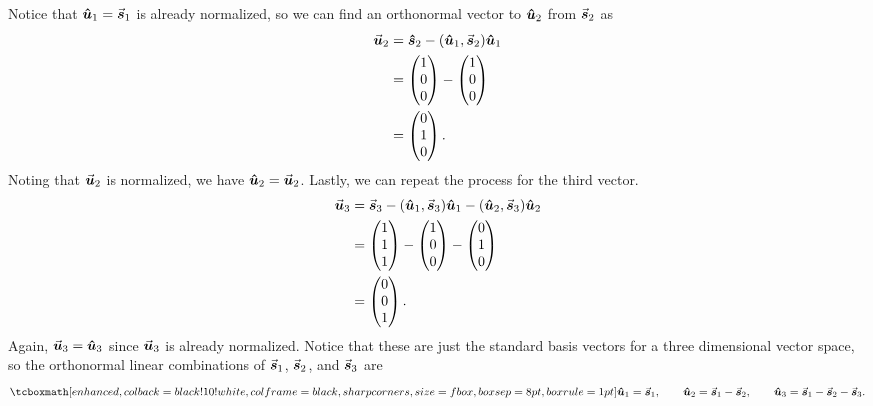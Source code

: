 Notice that $\vu*{u}_{1} = \va*{s}_{1}$ is already normalized, so we can find an orthonormal vector to $\vu*{u}_{2}$ from $\va*{s}_{2}$ as
\begin{align}
    \label{eq:u2-vec}
    \va*{u}_{2} &= \vu*{s}_{2} - (\vu*{u}_{1},\va*{s}_{2})\vu*{u}_{1} \\
                &= \begin{pmatrix} 1 \\ 0 \\ 0\end{pmatrix} - \begin{pmatrix} 1 \\ 0 \\ 0\end{pmatrix} \\
                &= \begin{pmatrix} 0 \\ 1 \\ 0\end{pmatrix}
.\end{align}
Noting that $\va*{u}_{2}$ is normalized, we have $\vu*{u}_{2} = \va*{u}_{2}$.
Lastly, we can repeat the process for the third vector.
\begin{align}
    \label{eq:u3-vec}
\va*{u}_{3} &= \va*{s}_{3} - (\vu*{u}_{1},\va*{s}_{3})\vu*{u}_{1} - (\vu*{u}_{2},\va*{s}_{3})\vu*{u}_{2} \\
           & = \begin{pmatrix} 1 \\ 1 \\ 1\end{pmatrix} - \begin{pmatrix} 1 \\ 0 \\ 0\end{pmatrix} - \begin{pmatrix} 0 \\ 1 \\ 0\end{pmatrix} \\ 
           &= \begin{pmatrix}
    0 \\ 0 \\ 1
    \end{pmatrix}
.\end{align}
Again, $\va*{u}_{3} = \vu*{u}_{3}$ since $\va*{u}_{3}$ is already normalized.
Notice that these are just the standard basis vectors for a three dimensional vector space, so the orthonormal linear combinations of $\va*{s}_{1}$, $\va*{s}_{2}$, and $\va*{s}_{3}$ are
\begin{align}
    \label{orthonormal-vecs} 
    \eqbox{
    \vu*{u}_{1} = \va*{s}_{1}, \qquad
    \vu*{u}_{2} = \va*{s}_{1} - \va*{s}_{2}, \qquad
    \vu*{u}_{3} = \va*{s}_{1} - \va*{s}_{2} - \va*{s}_{3}
    }
.\end{align}


